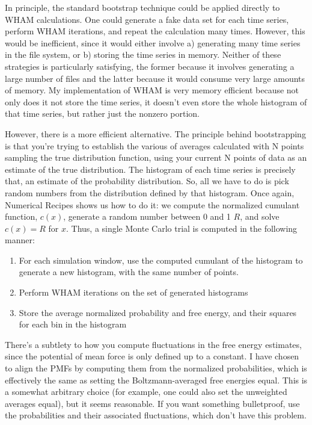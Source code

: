 \documentclass[12pt]{article}
\begin{document}
In principle, the standard bootstrap technique could be applied directly to
WHAM calculations.  One could generate a fake data set for each time
series, perform WHAM iterations, and repeat the calculation many times.
However, this would be inefficient, since it would either involve a)
generating many time series in the file system, or b) storing the time
series in memory.  Neither of these strategies is particularly satisfying,
the former because it involves generating a large number of files and the
latter because it would consume very large amounts of memory.  
My implementation of WHAM is very memory efficient because not only does it
not store the time series, it doesn't even store the whole histogram of
that time series, but rather just the nonzero portion.

However, there is a more efficient alternative.  The principle behind
bootstrapping is that you're trying to establish the various of averages
calculated with N points sampling the true distribution function, using
your current N points of data as an estimate of the true distribution.
The histogram of each time series is precisely that, an estimate of the
probability distribution.  So, all we have to do is pick random numbers
from the distribution defined by that histogram.  Once again, Numerical
Recipes shows us how to do it: we compute the normalized cumulant function,
$c(x)$, generate a random number between 0 and 1 $R$, and solve $c(x) = R$ 
for $x$.  Thus, a single Monte Carlo trial is computed in the following manner:

\begin{enumerate}

\item For each simulation window, use the computed cumulant of the histogram
to generate a new histogram, with the same number of points.

\item Perform WHAM iterations on the set of generated histograms

\item Store the average normalized probability and free energy, and their
squares for each bin in the histogram 
\end{enumerate}

There's a subtlety to how you compute fluctuations in the free energy
estimates, since the potential of mean force is only defined up to a
constant.  I have chosen to align the PMFs by computing them from the
normalized probabilities, which is effectively the same as setting the
Boltzmann-averaged free energies equal.  This is a somewhat arbitrary choice
(for example, one could also set the unweighted averages equal), but it seems
reasonable.  If you want something bulletproof, use the probabilities and
their associated fluctuations, which don't have this problem.
\end{document}
